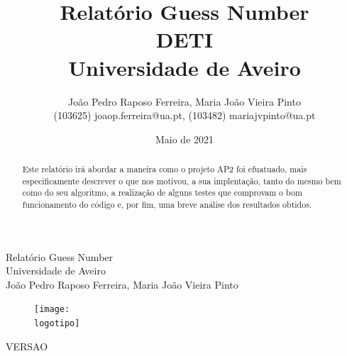 \documentclass{report}
\begin{document}
%
\def\titulo{Relatório Guess Number}
\def\data{Maio de 2021}
\def\autores{João Pedro Raposo Ferreira, Maria João Vieira Pinto}
\def\autorescontactos{(103625) joaop.ferreira@ua.pt, (103482) mariajvpinto@ua.pt}
\def\versao{VERSAO}
\def\departamento{DETI}
\def\empresa{Universidade de Aveiro}
\def\logotipo{ua.pdf}
%
%
\renewcommand{\contentsname}{Índice}
\begin{titlepage}

\begin{center}
%
\vspace*{50mm}
%
{\Huge \titulo}\\ 
%
\vspace{10mm}
%
{\Large \empresa}\\
%
\vspace{10mm}
%
{\LARGE \autores}\\ 
%
\vspace{30mm}
%
\begin{figure}[h]
\center
\texttt{[image: \\logotipo]}
\end{figure}
%
\vspace{30mm}
\end{center}
%
\begin{flushright}
\versao
\end{flushright}
\end{titlepage}

\title{%
{\Huge\textbf{\titulo}}\\
{\Large \departamento\\ \empresa}
}
%
\author{%
    \autores \\
    \autorescontactos
}
%
\date{\data}
%
\maketitle


\begin{abstract}
Este relatório irá abordar a maneira como o projeto AP2 foi efuatuado, mais especificamente descrever o que nos motivou, a sua implentação, tanto do mesmo bem como do seu algoritmo, a realização de alguns testes que comprovam o bom funcionamento do código e, por fim, uma breve análise dos resultados obtidos.
\end{abstract}

\end{document}
